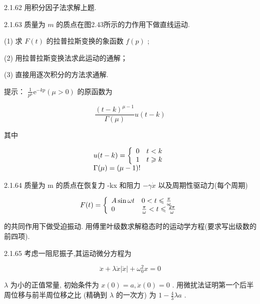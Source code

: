 \begin{problem}{2.1.62}
用积分因子法求解上题.
\end{problem}
\clearpage


\begin{problem}{2.1.63}
质量为 $m$ 的质点在图2.43所示的力作用下做直线运动.

(1) 求 $F(t)$ 的拉普拉斯变换的象函数 $f(p)$ ;

(2) 用拉普拉斯变换法求此运动的通解；

(3) 直接用逐次积分的方法求通解.

提示： $\frac{1}{p^{\mu}}\mathrm{e}^{-kp}(\mu >0)$ 的原函数为

\[
\frac {(t - k) ^ {\mu - 1}}{\Gamma (\mu)} u (t - k)
\]

其中

\[
\begin{array}{l} u (t - k) = \left\{ \begin{array}{l l} 0 & t <   k \\ 1 & t \geqslant k \end{array} \right. \\ \Gamma (\mu) = (\mu - 1)! \end{array}
\]
\begin{center}

\end{center}
\end{problem}
\clearpage


\begin{problem}{2.1.64}
质量为 m 的质点在恢复力 -kx 和阻力 $-\gamma \dot{x}$ 以及周期性驱动力(每个周期)

\[
F (t) = \left\{ \begin{array}{l l} A \sin \omega t & 0 <   t \leqslant \frac {\pi}{\omega} \\ 0 & \frac {\pi}{\omega} <   t \leqslant \frac {2 \pi}{\omega} \end{array} \right.
\]

的共同作用下做受迫振动. 用傅里叶级数求解稳态时的运动学方程(要求写出级数的前四项).
\end{problem}
\clearpage


\begin{problem}{2.1.65}
考虑一阻尼振子,其运动微分方程为

\[
\ddot {x} + \lambda \dot {x} | \dot {x} | + \omega_ {0} ^ {2} x = 0
\]

$\lambda$ 为小的正值常量, 初始条件为 $x(0) = a, \dot{x}(0) = 0$ . 用微扰法证明第一个后半周位移与前半周位移之比 (精确到 $\lambda$ 的一次方) 为 $1 - \frac{4}{3} \lambda a$ .
\end{problem}
\clearpage


